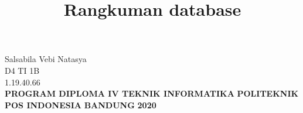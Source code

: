 \documentclass{article}
\begin{document}
\title{\huge\textbf{Rangkuman database}}
\date{}
\maketitle



\begin{center}
\vspace{4cm}
Salsabila Vebi Natasya\\
D4 TI 1B\\
1.19.40.66\\
\vspace{4cm}
\textbf{PROGRAM DIPLOMA IV TEKNIK INFORMATIKA}\linebreak
\textbf{POLITEKNIK POS INDONESIA}\linebreak
\textbf{BANDUNG}\linebreak
\textbf{2020}

\end{center}
\newpage
\end{document}
